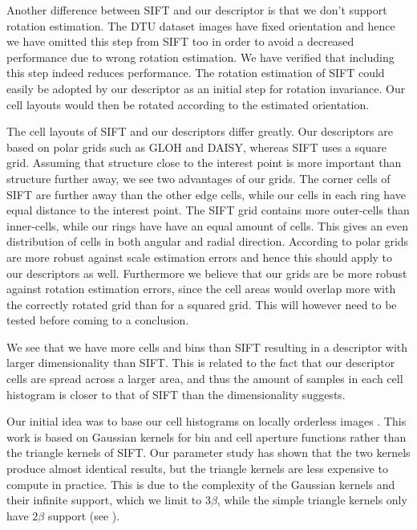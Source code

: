 \documentclass[thesis.tex]{subfiles}
\begin{document}
Another difference between SIFT and our descriptor is that we don't support rotation estimation. The DTU dataset images have fixed orientation and hence we have omitted this step from SIFT too in order to avoid a decreased performance due to wrong rotation estimation. We have verified that including this step indeed reduces performance. The rotation estimation of SIFT could easily be adopted by our descriptor as an initial step for rotation invariance. Our cell layouts would then be rotated according to the estimated orientation.

The cell layouts of SIFT and our descriptors differ greatly. Our descriptors are based on polar grids such as GLOH and DAISY, whereas SIFT uses a square grid. Assuming that structure close to the interest point is more important than structure further away, we see two advantages of our grids. The corner cells of SIFT are further away than the other edge cells, while our cells in each ring have equal distance to the interest point. The SIFT grid contains more outer-cells than inner-cells, while our rings have have an equal amount of cells. This gives an even distribution of cells in both angular and radial direction. According to \citet{cui2009scale} polar grids are more robust against scale estimation errors and hence this should apply to our descriptors as well. Furthermore we believe that our grids are be more robust against rotation estimation errors, since the cell areas would overlap more with the correctly rotated grid than for a squared grid. This will however need to be tested before coming to a conclusion.

We see that we have more cells and bins than SIFT resulting in a descriptor with larger dimensionality than SIFT. This is related to the fact that our descriptor cells are spread across a larger area, and thus the amount of samples in each cell histogram is closer to that of SIFT than the dimensionality suggests.

Our initial idea was to base our cell histograms on locally orderless images \cite{koenderink1999structure}. This work is based on Gaussian kernels for bin and cell aperture functions rather than the triangle kernels of SIFT. Our parameter study has shown that the two kernels produce almost identical results, but the triangle kernels are less expensive to compute in practice. This is due to the complexity of the Gaussian kernels and their infinite support, which we limit to 3$\beta$, while the simple triangle kernels only have $2\beta$ support (see ).
\end{document}
